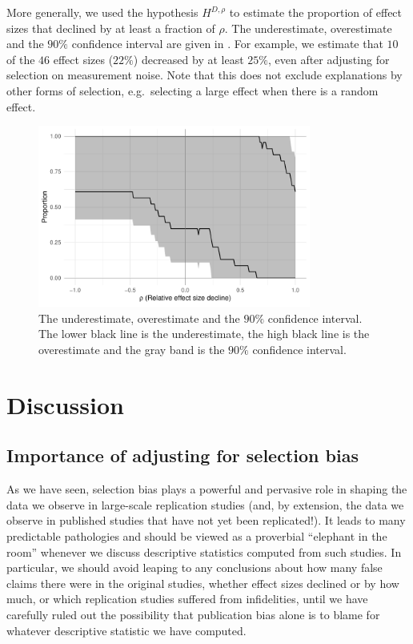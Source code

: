 \documentclass[aoas, preprint]{imsart}
\theoremstyle{definition}
\theoremstyle{custom}
\begin{document}
  More generally, we used the hypothesis $H^{D,\rho}$ to estimate the proportion of effect sizes that declined by at least a fraction of $\rho$. The underestimate, overestimate and the $90\%$ confidence interval are given in . For example, we estimate that $10$ of the $46$ effect sizes ($22\%$) decreased by at least $25\%$, even after adjusting for selection on measurement noise. Note that this does not exclude explanations by other forms of selection, e.g.\ selecting a large effect when there is a random effect.
  \begin{figure}[htbp]
    \centering
    \includegraphics[width=0.8\textwidth]{effect-decline-range}
    \caption{The underestimate, overestimate and the $90\%$ confidence interval. The lower black line is the underestimate, the high black line is the overestimate and the gray band is the $90\%$ confidence interval.}
  \label{fig:effect-decline-range}
  \end{figure}

\section{Discussion}
\label{sec:discussion}

\subsection{Importance of adjusting for selection bias}

  As we have seen, selection bias plays a powerful and pervasive role in shaping the data we observe in large-scale replication studies (and, by extension, the data we observe in published studies that have not yet been replicated!). It leads to many predictable pathologies and should be viewed as a proverbial ``elephant in the room'' whenever we discuss descriptive statistics computed from such studies. In particular, we should avoid leaping to any conclusions about how many false claims there were in the original studies, whether effect sizes declined or by how much, or which replication studies suffered from infidelities, until we have carefully ruled out the possibility that publication bias alone is to blame for whatever descriptive statistic we have computed.
\end{document}
